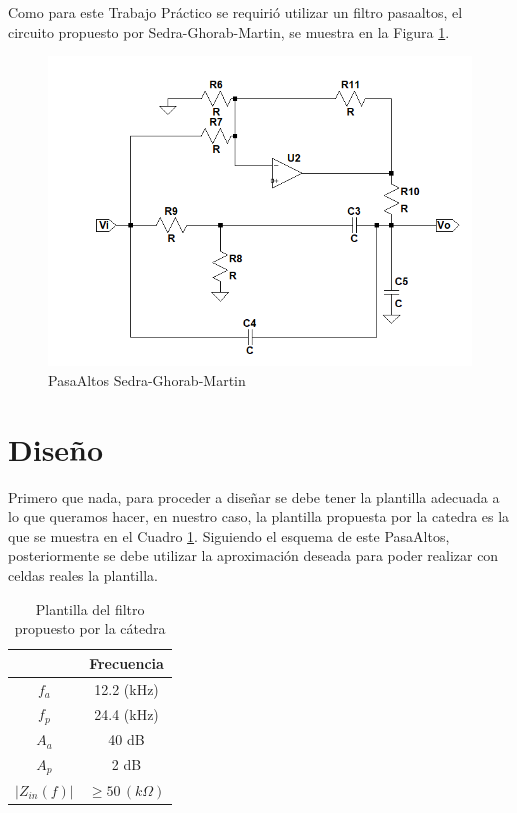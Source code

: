 Como para este Trabajo Práctico se requirió utilizar un filtro pasaaltos,
el circuito propuesto por Sedra-Ghorab-Martin, se muestra en la Figura
\ref{3_2}.

\begin{figure}[H]
\begin{centering}
\includegraphics[scale=0.5]{Resources/SedraCir}
\par\end{centering}
\caption{PasaAltos Sedra-Ghorab-Martin}
\label{3_2}

\end{figure}

\section{Diseño}

Primero que nada, para proceder a diseñar se debe tener la plantilla
adecuada a lo que queramos hacer, en nuestro caso, la plantilla propuesta
por la catedra es la que se muestra en el Cuadro \ref{3_c_1}. Siguiendo
el esquema de este PasaAltos, posteriormente se debe utilizar la aproximación
deseada para poder realizar con celdas reales la plantilla.

\begin{table}[H]
\begin{centering}
\begin{tabular}{|c|c|}
\hline 
 & Frecuencia\tabularnewline
\hline 
\hline 
$f_{a}$ & 12.2 (kHz)\tabularnewline
\hline 
$f_{p}$ & 24.4 (kHz)\tabularnewline
\hline 
$A_{a}$ & 40 dB\tabularnewline
\hline 
$A_{p}$ & 2 dB\tabularnewline
\hline 
$\left|Z_{in}(f)\right|$ & $\geq50\,(k\Omega)$\tabularnewline
\hline 
\end{tabular}
\par\end{centering}
\caption{Plantilla del filtro propuesto por la cátedra}
\label{3_c_1}

\end{table}

